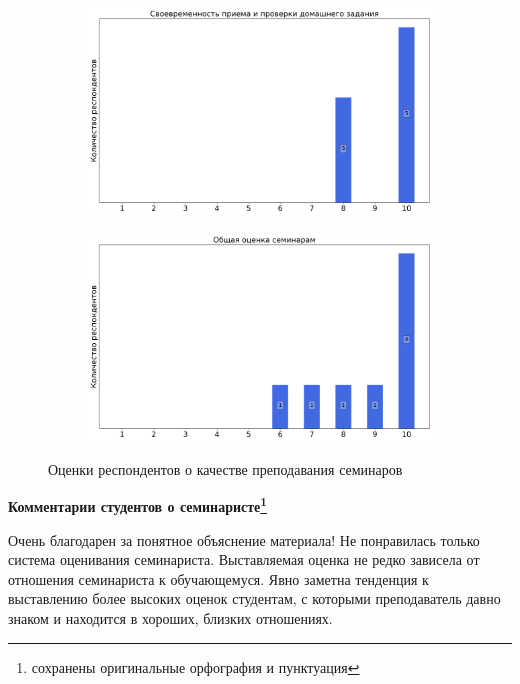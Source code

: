 \begin{figure}[H]
\begin{subfigure}[b]{0.45\textwidth}
                    \centering
                    \includegraphics[width=\textwidth]{images/3 course/Общая физика - квантовая физика/seminarists-marks-Овчинкин В.А.-2.png}
                \end{subfigure}
                \begin{subfigure}[b]{0.45\textwidth}
                    \centering
                    \includegraphics[width=\textwidth]{images/3 course/Общая физика - квантовая физика/seminarists-marks-Овчинкин В.А.-3.png}
                \end{subfigure}	
                \caption{Оценки респондентов о качестве преподавания семинаров}
            \end{figure}

            \textbf{Комментарии студентов о семинаристе\protect\footnote{сохранены оригинальные орфография и пунктуация}}
                \begin{commentbox} 
                    Очень благодарен за понятное объяснение материала! Не понравилась только система оценивания семинариста. Выставляемая оценка не редко зависела от отношения семинариста к обучающемуся. Явно заметна тенденция к выставлению более высоких оценок студентам, с которыми преподаватель давно знаком и находится в хороших, близких отношениях. 
                \end{commentbox} 
            
